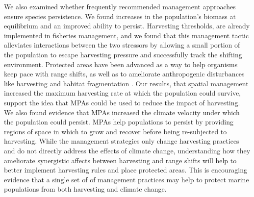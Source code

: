 \documentclass[12pt,english]{article}
\begin{document}
\begin{spacing}{1.9}
\begin{flushleft}
We also examined whether frequently recommended management approaches ensure species persistence. We found increases in the population's biomass at equilibrium and an improved ability to persist. Harvesting thresholds, are already implemented in fisheries management, and we found that this management tactic alleviates interactions between the two stressors by allowing a small portion of the population to escape harvesting pressure and successfully track the shifting environment.  Protected areas have been advanced as a way to help organisms keep pace with range shifts, as well as to ameliorate anthropogenic disturbances like harvesting and habitat fragmentation \citep{Lawleretal2010, Hannahetal2007,Botsfordetal2001, Gaylordetal2005, HastingsBotsford2003,Thomasetal2012}. Our results, that spatial management increased the maximum harvesting rate at which the population could survive, support the idea that MPAs could be used to reduce the impact of harvesting.  We also found evidence that MPAs increased the climate velocity under which the population could persist.  MPAs help populations to persist by providing regions of space in which to grow and recover before being re-subjected to harvesting.  While the management strategies only change harvesting practices and do not directly address the effects of climate change, understanding how they ameliorate synergistic affects between harvesting and range shifts will help to better implement harvesting rules and place protected areas.  This is encouraging evidence that a single set of of management practices may help to protect marine populations from both harvesting and climate change.




\end{flushleft}
\end{spacing}
\end{document}
